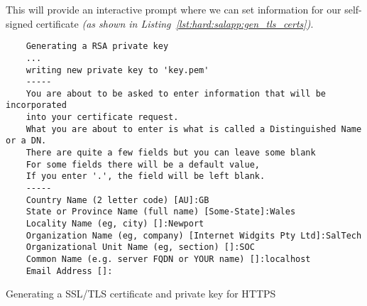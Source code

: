 \noindent This will provide an interactive prompt where we can set information for our self-signed certificate \textit{(as shown in Listing~\ref{lst:hard:salapp:gen_tls_certs})}.

\begin{listing}[H]
  \captionsetup{skip=\skiplistingcaptionlen}
  \begin{verbatim}
    Generating a RSA private key
    ...
    writing new private key to 'key.pem'
    -----
    You are about to be asked to enter information that will be incorporated
    into your certificate request.
    What you are about to enter is what is called a Distinguished Name or a DN.
    There are quite a few fields but you can leave some blank
    For some fields there will be a default value,
    If you enter '.', the field will be left blank.
    -----
    Country Name (2 letter code) [AU]:GB
    State or Province Name (full name) [Some-State]:Wales
    Locality Name (eg, city) []:Newport
    Organization Name (eg, company) [Internet Widgits Pty Ltd]:SalTech
    Organizational Unit Name (eg, section) []:SOC
    Common Name (e.g. server FQDN or YOUR name) []:localhost
    Email Address []:
  \end{verbatim}
  \caption{Generating a SSL/TLS certificate and private key for HTTPS}
  \label{lst:hard:salapp:gen_tls_certs}
\end{listing}

